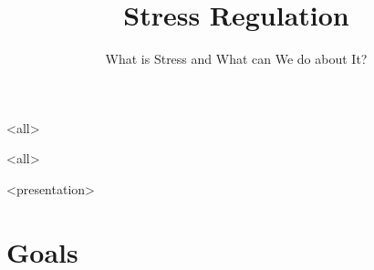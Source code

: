 \graphicspath{{images/}} %


\title[Stress regulation]{Stress Regulation} %
\subtitle{What is Stress and What can We do about It?}
\mode<all>

\mode*

\mode<all>

\mode*

\mode
<presentation>
{ \begin{frame}
\titlepage %
\end{frame}}

\maketitle



\section{Goals} 

